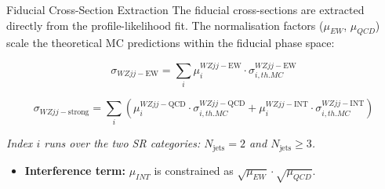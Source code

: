 \begin{frame}{Fiducial Cross-Section Extraction}    
    The fiducial cross-sections are extracted directly from the profile-likelihood fit. The normalisation factors ($\mu_{EW}$, $\mu_{QCD}$) scale the theoretical MC predictions within the fiducial phase space:
    
    \begin{equation*}
        \sigma_{WZjj-\text{EW}} = \sum_{i} \mu_i^{WZjj-\text{EW}} \cdot \sigma_{i,th.MC}^{WZjj-\text{EW}}
    \end{equation*}
    
    \begin{equation*}
        \sigma_{WZjj-\text{strong}} = \sum_{i} \left( \mu_i^{WZjj-\text{QCD}} \cdot \sigma_{i,th.MC}^{WZjj-\text{QCD}} + \mu_i^{WZjj-\text{INT}} \cdot \sigma_{i,th.MC}^{WZjj-\text{INT}} \right)
    \end{equation*}
    \vspace{0.2cm}
    
    \textit{\scriptsize *Index $i$ runs over the two SR categories: $N_{\text{jets}} = 2$ and $N_{\text{jets}} \geq 3$.}
    
    \vspace{0.3cm}
    \begin{itemize}
        \item \textbf{Interference term:} $\mu_{INT}$ is constrained as $\sqrt{\mu_{EW}} \cdot \sqrt{\mu_{QCD}}$.
    \end{itemize}
\end{frame}

